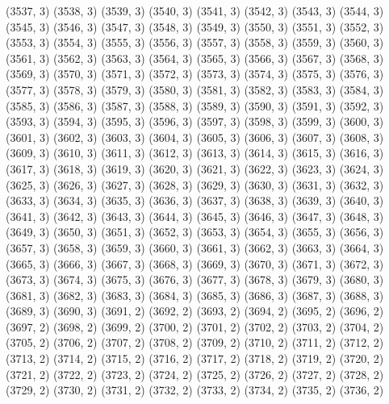 {   (3537, 3)
   (3538, 3)
   (3539, 3)
   (3540, 3)
   (3541, 3)
   (3542, 3)
   (3543, 3)
   (3544, 3)
   (3545, 3)
   (3546, 3)
   (3547, 3)
   (3548, 3)
   (3549, 3)
   (3550, 3)
   (3551, 3)
   (3552, 3)
   (3553, 3)
   (3554, 3)
   (3555, 3)
   (3556, 3)
   (3557, 3)
   (3558, 3)
   (3559, 3)
   (3560, 3)
   (3561, 3)
   (3562, 3)
   (3563, 3)
   (3564, 3)
   (3565, 3)
   (3566, 3)
   (3567, 3)
   (3568, 3)
   (3569, 3)
   (3570, 3)
   (3571, 3)
   (3572, 3)
   (3573, 3)
   (3574, 3)
   (3575, 3)
   (3576, 3)
   (3577, 3)
   (3578, 3)
   (3579, 3)
   (3580, 3)
   (3581, 3)
   (3582, 3)
   (3583, 3)
   (3584, 3)
   (3585, 3)
   (3586, 3)
   (3587, 3)
   (3588, 3)
   (3589, 3)
   (3590, 3)
   (3591, 3)
   (3592, 3)
   (3593, 3)
   (3594, 3)
   (3595, 3)
   (3596, 3)
   (3597, 3)
   (3598, 3)
   (3599, 3)
   (3600, 3)
   (3601, 3)
   (3602, 3)
   (3603, 3)
   (3604, 3)
   (3605, 3)
   (3606, 3)
   (3607, 3)
   (3608, 3)
   (3609, 3)
   (3610, 3)
   (3611, 3)
   (3612, 3)
   (3613, 3)
   (3614, 3)
   (3615, 3)
   (3616, 3)
   (3617, 3)
   (3618, 3)
   (3619, 3)
   (3620, 3)
   (3621, 3)
   (3622, 3)
   (3623, 3)
   (3624, 3)
   (3625, 3)
   (3626, 3)
   (3627, 3)
   (3628, 3)
   (3629, 3)
   (3630, 3)
   (3631, 3)
   (3632, 3)
   (3633, 3)
   (3634, 3)
   (3635, 3)
   (3636, 3)
   (3637, 3)
   (3638, 3)
   (3639, 3)
   (3640, 3)
   (3641, 3)
   (3642, 3)
   (3643, 3)
   (3644, 3)
   (3645, 3)
   (3646, 3)
   (3647, 3)
   (3648, 3)
   (3649, 3)
   (3650, 3)
   (3651, 3)
   (3652, 3)
   (3653, 3)
   (3654, 3)
   (3655, 3)
   (3656, 3)
   (3657, 3)
   (3658, 3)
   (3659, 3)
   (3660, 3)
   (3661, 3)
   (3662, 3)
   (3663, 3)
   (3664, 3)
   (3665, 3)
   (3666, 3)
   (3667, 3)
   (3668, 3)
   (3669, 3)
   (3670, 3)
   (3671, 3)
   (3672, 3)
   (3673, 3)
   (3674, 3)
   (3675, 3)
   (3676, 3)
   (3677, 3)
   (3678, 3)
   (3679, 3)
   (3680, 3)
   (3681, 3)
   (3682, 3)
   (3683, 3)
   (3684, 3)
   (3685, 3)
   (3686, 3)
   (3687, 3)
   (3688, 3)
   (3689, 3)
   (3690, 3)
   (3691, 2)
   (3692, 2)
   (3693, 2)
   (3694, 2)
   (3695, 2)
   (3696, 2)
   (3697, 2)
   (3698, 2)
   (3699, 2)
   (3700, 2)
   (3701, 2)
   (3702, 2)
   (3703, 2)
   (3704, 2)
   (3705, 2)
   (3706, 2)
   (3707, 2)
   (3708, 2)
   (3709, 2)
   (3710, 2)
   (3711, 2)
   (3712, 2)
   (3713, 2)
   (3714, 2)
   (3715, 2)
   (3716, 2)
   (3717, 2)
   (3718, 2)
   (3719, 2)
   (3720, 2)
   (3721, 2)
   (3722, 2)
   (3723, 2)
   (3724, 2)
   (3725, 2)
   (3726, 2)
   (3727, 2)
   (3728, 2)
   (3729, 2)
   (3730, 2)
   (3731, 2)
   (3732, 2)
   (3733, 2)
   (3734, 2)
   (3735, 2)
   (3736, 2)
}
